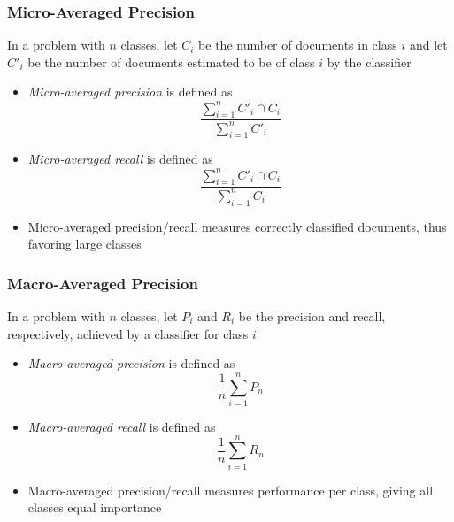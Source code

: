 \documentclass{beamer}
\begin{document}

\begin{frame} \frametitle{Micro-Averaged Precision}
  
  In a problem with $n$ classes, let $C_i$ be the number of documents in class
  $i$ and let $C'_i$ be the number of documents estimated to be of class $i$ by
  the classifier
  \begin{itemize}
  \item \emph{Micro-averaged precision} is defined as
    \begin{displaymath}
      \frac{\sum_{i=1}^n C'_i \cap C_i}{\sum_{i=1}^n C'_i}
    \end{displaymath}
  \item \emph{Micro-averaged recall} is defined as
    \begin{displaymath}
      \frac{\sum_{i=1}^n C'_i \cap C_i}{\sum_{i=1}^n C_i}
    \end{displaymath}
  \end{itemize}
  \begin{itemize}
  \item Micro-averaged precision/recall measures correctly classified
    documents, thus favoring large classes
  \end{itemize}
\end{frame}


\begin{frame} \frametitle{Macro-Averaged Precision}
  
  In a problem with $n$ classes, let $P_i$ and $R_i$ be the precision and
  recall, respectively, achieved by a classifier for class $i$
  \begin{itemize}
  \item \emph{Macro-averaged precision} is defined as
    \begin{displaymath}
      \frac{1}{n}\sum_{i=1}^n P_n
    \end{displaymath}
  \item \emph{Macro-averaged recall} is defined as
    \begin{displaymath}
      \frac{1}{n}\sum_{i=1}^n R_n
    \end{displaymath}
  \end{itemize}
  \begin{itemize}
  \item Macro-averaged precision/recall measures performance per class, giving
    all classes equal importance
  \end{itemize}
\end{frame}
\end{document}
